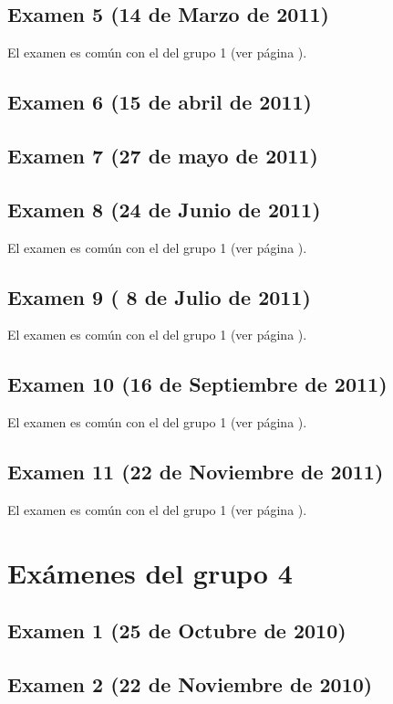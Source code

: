 \documentclass[a4paper,12pt,twoside]{book}
\begin{document}
\section{Examen 5 (14 de Marzo de 2011)} 
El examen es común con el del grupo 1 (ver página \pageref{examen_10_11_4_5}).
\section{Examen 6 (15 de abril de 2011)}
\section{Examen 7 (27 de mayo de 2011)} 
\section{Examen 8 (24 de Junio de 2011)} 
El examen es común con el del grupo 1 (ver página \pageref{examen_10_11_4_8}).
\section{Examen 9 ( 8 de Julio de 2011)} 
El examen es común con el del grupo 1 (ver página \pageref{examen_10_11_4_9}).
\section{Examen 10 (16 de Septiembre de 2011)} 
El examen es común con el del grupo 1 (ver página \pageref{examen_10_11_4_10}).
\section{Examen 11 (22 de Noviembre de 2011)} 
El examen es común con el del grupo 1 (ver página \pageref{examen_10_11_4_11}).

\chapter{Exámenes del grupo 4}

\section{Examen 1 (25 de Octubre de 2010)}
\section{Examen 2 (22 de Noviembre de 2010)}
\end{document}

